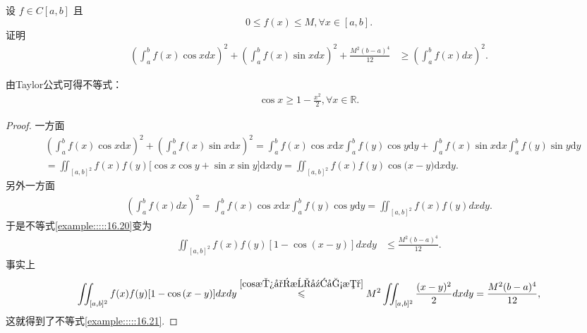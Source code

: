 \documentclass[../../main.tex]{subfiles}
\begin{document}
\begin{example}
设 $f \in C[a,b]$ 且
\[0 \leqslant f(x) \leqslant M, \forall x \in [a,b].\]
证明
\begin{align}\label{example:::::16.20}
\left(\int_{a}^{b}f(x)\cos xdx\right)^2 + \left(\int_{a}^{b}f(x)\sin xdx\right)^2 + \frac{M^2(b - a)^4}{12} &\geqslant \left(\int_{a}^{b}f(x)dx\right)^2.
\end{align}
\end{example}
\begin{remark}
由Taylor公式可得不等式：
\begin{align}\label{cos放小成幂函数}
\cos x\geq 1-\frac{x^2}{2},\forall x\in \mathbb{R}.
\end{align}
\end{remark}
\begin{proof}
一方面
\begin{align*}
&\left( \int_a^b{f(x)\cos x\mathrm{d}x} \right) ^2+\left( \int_a^b{f(x)\sin x\mathrm{d}x} \right) ^2=\int_a^b{f(x)\cos x\mathrm{d}x}\int_a^b{f(y)\cos y\mathrm{d}y}+\int_a^b{f(x)\sin x\mathrm{d}x}\int_a^b{f(y)\sin y\mathrm{d}y}
\\
&=\iint_{[a,b]^2}{f(x)f(y)[\cos x\cos y}+\sin x\sin y]\mathrm{d}x\mathrm{d}y=\iint_{[a,b]^2}{f(x)f(y)\cos\mathrm{(}x}-y)\mathrm{d}x\mathrm{d}y.
\end{align*}
另外一方面
\begin{align*}
\left( \int_a^b{f(x)dx} \right) ^2=\int_a^b{f(x)\cos x\mathrm{d}x}\int_a^b{f(y)\cos y\mathrm{d}y}=\iint_{[a,b]^2}{f(x)f(y)dxdy.}
\end{align*}
于是不等式\eqref{example:::::16.20}变为
\begin{align}\label{example:::::16.21}
\iint_{[a,b]^2}f(x)f(y)[1 - \cos(x - y)]dxdy &\leqslant \frac{M^2(b - a)^4}{12}.
\end{align}
事实上
\begin{align*}
\iint_{[a,b]^2}{f(x)f(y)[1}-\cos\mathrm{(}x-y)]dxdy\overset{\eqref{cos放小成幂函数}}{\leqslant}M^2\iint_{[a,b]^2}{\frac{(x-y)^2}{2}dxdy}=\frac{M^2(b-a)^4}{12},
\end{align*}
这就得到了不等式\eqref{example:::::16.21}. 
\end{proof}
\end{document}
